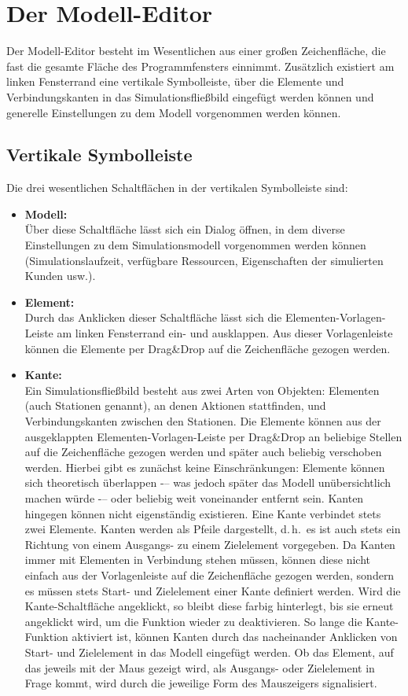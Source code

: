 \documentclass[deutsch]{svmono}
\begin{document}
\chapter{Der Modell-Editor}

Der Modell-Editor besteht im Wesentlichen aus einer großen Zeichenfläche, die fast die gesamte Fläche des Programmfensters einnimmt. Zusätzlich existiert am linken Fensterrand eine vertikale Symbolleiste, über die Elemente und Verbindungskanten in das Simulationsfließbild eingefügt werden können und generelle Einstellungen zu dem Modell vorgenommen werden können.

\section{Vertikale Symbolleiste}

Die drei wesentlichen Schaltflächen in der vertikalen Symbolleiste sind:

\begin{itemize}
\item
\textbf{Modell:}\\
Über diese Schaltfläche lässt sich ein Dialog öffnen, in dem diverse Einstellungen zu dem Simulationsmodell vorgenommen werden können (Simulationslaufzeit, verfügbare Ressourcen, Eigenschaften der simulierten Kunden usw.).
\item
\textbf{Element:}\\
Durch das Anklicken dieser Schaltfläche lässt sich die Elementen-Vorlagen-Leiste am linken Fensterrand ein- und ausklappen. Aus dieser Vorlagenleiste können die Elemente per Drag\&Drop auf die Zeichenfläche gezogen werden.
\item
\textbf{Kante:}\\
Ein Simulationsfließbild besteht aus zwei Arten von Objekten: Elementen (auch Stationen genannt), an denen Aktionen stattfinden, und Verbindungskanten zwischen den Stationen. Die Elemente können aus der ausgeklappten Elementen-Vorlagen-Leiste per Drag\&Drop an beliebige Stellen auf die Zeichenfläche gezogen werden und später auch beliebig verschoben werden. Hierbei gibt es zunächst keine Einschränkungen: Elemente können sich theoretisch überlappen -– was jedoch später das Modell unübersichtlich machen würde -– oder beliebig weit voneinander entfernt sein. Kanten hingegen können nicht eigenständig existieren. Eine Kante verbindet stets zwei Elemente. Kanten werden als Pfeile dargestellt, d.\,h.\ es ist auch stets ein Richtung von einem Ausgangs- zu einem Zielelement vorgegeben. Da Kanten immer mit Elementen in Verbindung stehen müssen, können diese nicht einfach aus der Vorlagenleiste auf die Zeichenfläche gezogen werden, sondern es müssen stets Start- und Zielelement einer Kante definiert werden. Wird die Kante-Schaltfläche angeklickt, so bleibt diese farbig hinterlegt, bis sie erneut angeklickt wird, um die Funktion wieder zu deaktivieren. So lange die Kante-Funktion aktiviert ist, können Kanten durch das nacheinander Anklicken von Start- und Zielelement in das Modell eingefügt werden. Ob das Element, auf das jeweils mit der Maus gezeigt wird, als Ausgangs- oder Zielelement in Frage kommt, wird durch die jeweilige Form des Mauszeigers signalisiert.
\end{itemize}
\end{document}
